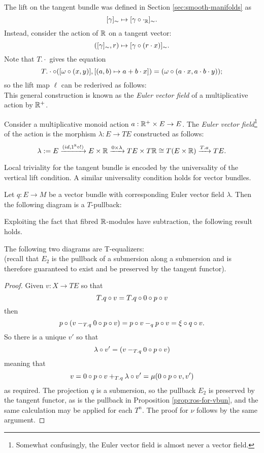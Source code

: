 The lift on the tangent bundle was defined in Section \ref{sec:smooth-manifolds} as
\[
  [\gamma]_\sim \mapsto [\gamma \circ \cdot_{\mathbb{R}}]_\sim. 
\]
Instead, consider the action of $\mathbb{R}$ on a tangent vector:
\[
  ([\gamma]_\sim, r) \mapsto [\gamma \circ (r \cdot x)]_\sim.
\]
Note that $T.\cdot$ gives the equation
\[
  T.\cdot \circ ([\omega \circ (x,y)], [(a,b) \mapsto a + b\cdot x]) = (\omega \circ (a \cdot x, a \cdot b\cdot y));
\]
so the lift map $\ell$ can be rederived as follows:
\[\]
This general construction is known as the \emph{Euler vector field} of a multiplicative action by $\mathbb{R}^+$.
\begin{definition}%
  \label{def:evf}
  Consider a multiplicative monoid action $a:\mathbb{R}^+ \times E \to E$. The \emph{Euler vector field}\footnote{Somewhat confusingly, the Euler vector field is almost never a vector field.} of the action is the morphism $\lambda:E \to TE$ constructed as follows:
  \[
    \lambda:= E \xrightarrow[]{(id, 1^{\mathbb{R}} \circ !)} E \times \mathbb{R} \xrightarrow{0 \times \lambda} TE \times T\mathbb{R} \cong T(E \times \mathbb{R}) \xrightarrow{T.a} TE.
  \]
\end{definition}
Local triviality for the tangent bundle is encoded by the universality of the vertical lift condition. A similar universality condition holds for vector bundles.
\begin{proposition}%
  \label{prop:ros-for-vbun}
  Let $q:E \to M$ be a vector bundle with corresponding Euler vector field $\lambda$.
  Then the following diagram is a $T$-pullback:
  \begin{equation*}
    
  \end{equation*}
\end{proposition}
Exploiting the fact that fibred $\mathbb{R}$-modules have subtraction, the following result holds.
\begin{corollary}%
  \label{cor:two-pullbacks-from-ros}
  The following two diagrams are T-equalizers:
  \[
    
  \]
  (recall that $E_2$ is the pullback of a submersion along a submersion and is therefore guaranteed to exist and be preserved by the tangent functor).
\end{corollary}
\begin{proof}
  Given $v: X \to TE$ so that
  \[ T.q \circ v = T.q \circ 0 \circ p \circ v \]
  then 
  \[ p \circ (v -_{T.q} 0 \circ p \circ v) =  p \circ v -_q p \circ v = \xi \circ q \circ v. \]
  So there is a unique $v'$ so that
  \[
    \lambda \circ v' = (v -_{T.q} 0 \circ p \circ v)
  \]
  meaning that
  \[
    v = 0 \circ p \circ v  +_{T.q} \lambda \circ v'  = \mu(0 \circ p \circ v, v')
  \] as required. The projection $q$ is a submersion, so the pullback $E_2$ is preserved by the tangent functor, as is the pullback in Proposition \ref{prop:ros-for-vbun}, and the same calculation may be applied for each $T^n$. The proof for $\nu$ follows by the same argument.
\end{proof}
